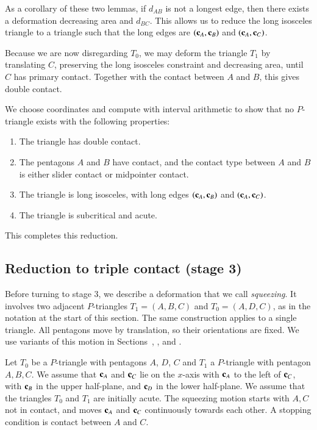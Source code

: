 As a corollary of these two lemmas, if $d_{AB}$ is not a longest edge,
then there exists a deformation decreasing area and $d_{BC}$.  This
allows us to reduce the long isosceles triangle to a triangle such
that the long edges are $({\mathbf c}_A,{\mathbf c}_B)$ and $({\mathbf c}_A,{\mathbf c}_C)$.

Because we are now disregarding $T_0$, we may deform the
triangle $T_1$ by translating $C$, preserving the long isosceles constraint
and decreasing area, until $C$ has primary contact. Together with the contact between
$A$ and $B$, this gives double contact.

 We choose coordinates and
compute with interval
arithmetic to show that no $P$-triangle exists with the
following properties:
\begin{enumerate}
\item The triangle has double contact.
\item The pentagons $A$ and $B$ have contact,
  and the contact type between $A$ and $B$ is either slider contact or
  midpointer contact.
\item The triangle is long isosceles, with long edges $({\mathbf c}_A,{\mathbf c}_B)$ and $({\mathbf c}_A,{\mathbf c}_C)$.
\item The triangle is subcritical and acute.
\end{enumerate}
This
completes this reduction.

\subsection{Reduction to triple contact (stage 3)}

Before turning to stage 3, we describe a deformation that we
call \emph{squeezing}.  It involves two adjacent $P$-triangles
$T_1=(A,B,C)$ and $T_0=(A,D,C)$, as in the notation at the
start of this section.  The same construction applies to a single
triangle.  All pentagons move by translation, so their orientations
are fixed.  We use variants of this motion in
Sections~, , and
.

Let $T_0$ be a $P$-triangle with pentagons $A$, $D$, $C$ and $T_1$ a
$P$-triangle with pentagon $A,B,C$.  We assume that ${\mathbf c}_A$ and ${\mathbf c}_C$
lie on the $x$-axis with ${\mathbf c}_A$ to the left of ${\mathbf c}_C$, with ${\mathbf c}_B$ in
the upper half-plane, and ${\mathbf c}_D$ in the lower half-plane.  We assume
that the triangles $T_0$ and $T_1$ are initially acute.  The squeezing
motion starts with $A,C$ not in contact, and moves ${\mathbf c}_A$ and
${\mathbf c}_C$ continuously towards each other.  A stopping condition is
contact between $A$ and $C$.

